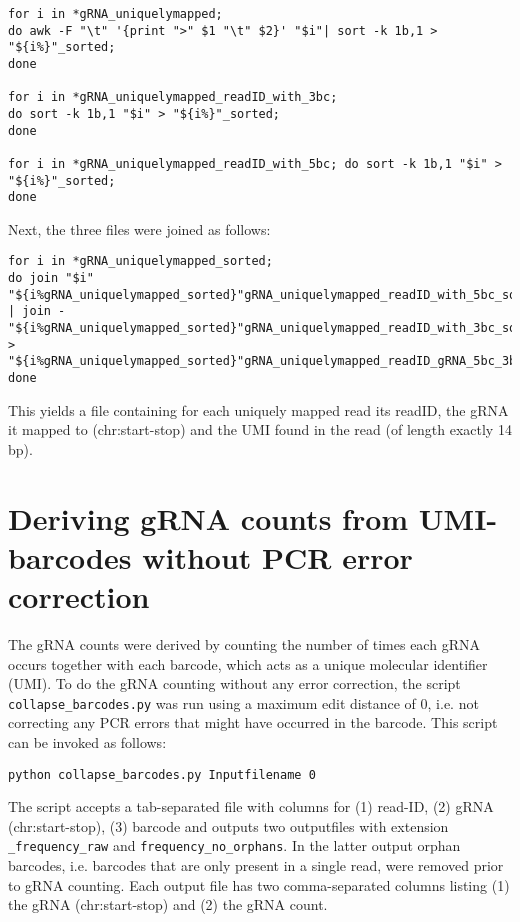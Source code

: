 \begin{lstlisting}
for i in *gRNA_uniquelymapped;
do awk -F "\t" '{print ">" $1 "\t" $2}' "$i"| sort -k 1b,1 > "${i%}"_sorted;
done

for i in *gRNA_uniquelymapped_readID_with_3bc;
do sort -k 1b,1 "$i" > "${i%}"_sorted;
done

for i in *gRNA_uniquelymapped_readID_with_5bc; do sort -k 1b,1 "$i" > "${i%}"_sorted;
done
\end{lstlisting}

Next, the three files were joined as follows:

\begin{lstlisting}
for i in *gRNA_uniquelymapped_sorted;
do join "$i" "${i%gRNA_uniquelymapped_sorted}"gRNA_uniquelymapped_readID_with_5bc_sorted | join - "${i%gRNA_uniquelymapped_sorted}"gRNA_uniquelymapped_readID_with_3bc_sorted > "${i%gRNA_uniquelymapped_sorted}"gRNA_uniquelymapped_readID_gRNA_5bc_3bc_length14;
done
\end{lstlisting}

This yields a file containing for each uniquely mapped read its readID, the gRNA it mapped to (chr:start-stop) and the UMI found in the read (of length exactly 14 bp).


\section{Deriving gRNA counts from UMI-barcodes without PCR error correction}

The gRNA counts were derived by counting the number of times each gRNA occurs together with each barcode, which acts as a unique molecular identifier (UMI). To do the gRNA counting without any error correction, the script \verb|collapse_barcodes.py| was run using a maximum edit distance of 0, i.e. not correcting any PCR errors that might have occurred in the barcode. This script can be invoked as follows:

\begin{lstlisting}
python collapse_barcodes.py Inputfilename 0
\end{lstlisting}

The script accepts a tab-separated file with columns for (1) read-ID, (2) gRNA (chr:start-stop), (3) barcode and outputs two outputfiles with extension \verb|_frequency_raw| and \verb|frequency_no_orphans|. In the latter output orphan barcodes, i.e. barcodes that are only present in a single read, were removed prior to gRNA counting. Each output file has two comma-separated columns listing (1) the gRNA (chr:start-stop) and (2) the gRNA count.

